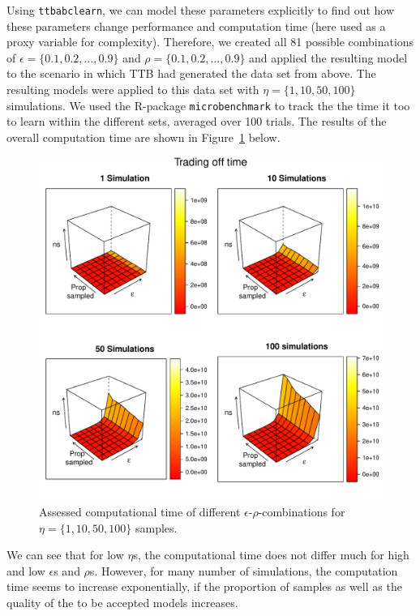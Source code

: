\documentclass[a4paper,man, natbib]{apa6}
\begin{document}
Using \texttt{ttbabclearn}, we can model these parameters explicitly to find out how these parameters change performance and computation time (here used as a proxy variable for complexity). Therefore, we created all 81 possible combinations of $\epsilon=\{0.1,0.2,\dots,0.9\}$ and $\rho=\{0.1,0.2,\dots,0.9\}$ and applied the resulting model to the scenario in which TTB had generated the data set from above. The resulting models were applied to this data set with $\eta=\{1,10,50,100\}$ simulations. We used the R-package \texttt{microbenchmark} to track the the time it too to learn within the different sets, averaged over 100 trials. The results of the overall computation time are shown in Figure~\ref{fig:timetradeoff} below.
\begin{figure}[htb!]
  \caption{Assessed computational time of different $\epsilon$-$\rho$-combinations for $\eta=\{1,10,50,100\}$ samples.}
\label{fig:timetradeoff}
  \centering
    \includegraphics[scale=0.6]{figs/timetradeoff.pdf}
\end{figure}
We can see that for low $\eta$s, the computational time does not differ much for high and low $\epsilon$s and $\rho$s. However, for many number of simulations, the computation time seems to increase exponentially, if the proportion of samples as well as the quality of the to be accepted models increases.
\end{document}
